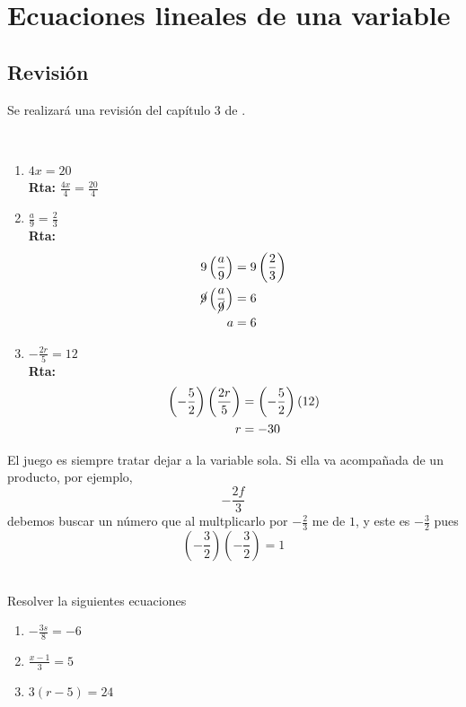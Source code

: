 \chapter{Ecuaciones lineales de una variable}\label{Capitulo_ecuaciones_lineales_de_una_variable}

\section{Revisión}\label{seccion_revision_ecuaciones_lineales}
Se realizará una revisión del capítulo 3 de \cite{Aops_algebra}.

\begin{ejemplo}{\ \\}
\begin{enumerate}
\item $4x=20$\\
		\textbf{Rta: }$\frac{4x}{4}=\frac{20}{4}$	
		
\item $\frac{a}{9}=\frac{2}{3}$\\
		\textbf{Rta: }
		\begin{align*}
			9\left(\frac{a}{9}\right)&=9\left(\frac{2}{3}\right)\\
			\cancel{9}\left(\frac{a}{\cancel{9}}\right)&=6\\
			a&=6
		\end{align*}

\item $-\frac{2r}{5}=12$\\
		\textbf{Rta: } 
		\begin{align*}
		\left(-\frac{5}{2}\right)\left(\-\frac{2r}{5}\right)&=	\left(-\frac{5}{2}\right)\left(12\right)\\
		r&=-30
		\end{align*}		
\end{enumerate}
\end{ejemplo}

\begin{tcolorbox}[colback=red!5!white,colframe=red!75!black]
El juego es siempre tratar dejar a la variable sola. Si ella va acompañada de un producto, por ejemplo,
\[-\frac{2f}{3}\]
debemos buscar un número que al multplicarlo por $-\frac{2}{3}$ me de $1$, y este es $-\frac{3}{2}$ pues
\[ \left(-\frac{3}{2} \right)\left(-\frac{3}{2}\right)=1 \]
\end{tcolorbox}

\begin{exer}{\ \\}
Resolver la siguientes ecuaciones
\begin{multicols}{3}
\begin{enumerate}[label=\Alph*)]
	\item $-\frac{3s}{8}=-6$
	\item $\frac{x-1}{3}=5$
	\item $3(r-5)=24$
\end{enumerate}
\end{multicols}
\end{exer}

